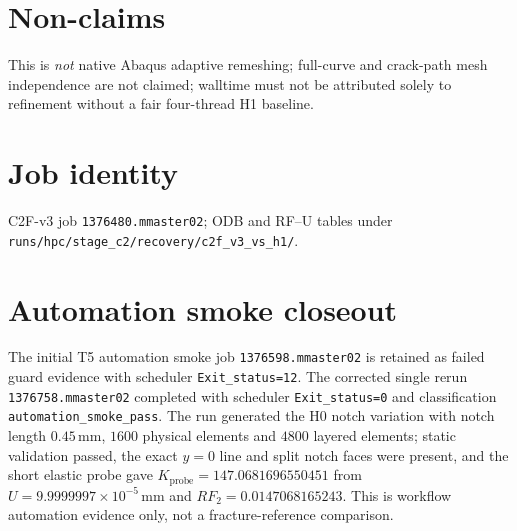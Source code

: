\documentclass[11pt,a4paper]{article}
\begin{document}
\section{Non-claims}
This is \emph{not} native Abaqus adaptive remeshing; full-curve and crack-path
mesh independence are not claimed; walltime must not be attributed solely to
refinement without a fair four-thread H1 baseline.

\section{Job identity}
C2F-v3 job \texttt{1376480.mmaster02}; ODB and RF--U tables under
\texttt{runs/hpc/stage\_c2/recovery/c2f\_v3\_vs\_h1/}.

\section{Automation smoke closeout}
The initial T5 automation smoke job \texttt{1376598.mmaster02} is retained as
failed guard evidence with scheduler \texttt{Exit\_status=12}. The corrected
single rerun \texttt{1376758.mmaster02} completed with scheduler
\texttt{Exit\_status=0} and classification
\texttt{automation\_smoke\_pass}. The run generated the H0 notch
variation with notch length $0.45\,\mathrm{mm}$, $1600$ physical elements and
$4800$ layered elements; static validation passed, the exact $y=0$ line and
split notch faces were present, and the short elastic probe gave
$K_\mathrm{probe}=147.0681696550451$ from
$U=9.9999997\times 10^{-5}\,\mathrm{mm}$ and
$RF_2=0.0147068165243$. This is workflow automation evidence only, not a
fracture-reference comparison.
\end{document}
